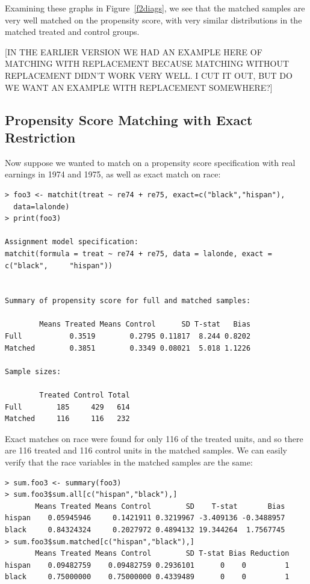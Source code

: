 \documentclass[oneside,letterpaper,titlepage]{article}
\begin{document}
Examining these graphs in Figure~\ref{f2diags}, we see that the matched samples are very well matched on the propensity score, with very similar distributions
in the matched treated and control groups.

[IN THE EARLIER VERSION WE HAD AN EXAMPLE HERE OF MATCHING WITH REPLACEMENT BECAUSE MATCHING WITHOUT REPLACEMENT DIDN'T WORK VERY WELL.  I CUT IT OUT, BUT
DO WE WANT AN EXAMPLE WITH REPLACEMENT SOMEWHERE?]

\subsection{Propensity Score Matching with Exact Restriction}

Now suppose we wanted to match on a propensity score specification with real earnings in 1974 and 1975, 
as well as exact match on race:

\begin{verbatim}
> foo3 <- matchit(treat ~ re74 + re75, exact=c("black","hispan"),
  data=lalonde)
> print(foo3)
 
Assignment model specification:
matchit(formula = treat ~ re74 + re75, data = lalonde, exact = c("black",     "hispan"))
 
 
Summary of propensity score for full and matched samples:
 
        Means Treated Means Control      SD T-stat   Bias
Full           0.3519        0.2795 0.11817  8.244 0.8202
Matched        0.3851        0.3349 0.08021  5.018 1.1226
 
Sample sizes:
 
        Treated Control Total
Full        185     429   614
Matched     116     116   232
\end{verbatim}

Exact matches on race were found for only 116 of the treated units, and so there are 116 treated and 116 control units in the matched samples.  We can 
easily verify that the race variables in the matched samples
are the same:

\begin{verbatim}
> sum.foo3 <- summary(foo3)
> sum.foo3$sum.all[c("hispan","black"),]
       Means Treated Means Control        SD    T-stat       Bias
hispan    0.05945946     0.1421911 0.3219967 -3.409136 -0.3488957
black     0.84324324     0.2027972 0.4894132 19.344264  1.7567745
> sum.foo3$sum.matched[c("hispan","black"),]
       Means Treated Means Control        SD T-stat Bias Reduction
hispan    0.09482759    0.09482759 0.2936101      0    0         1
black     0.75000000    0.75000000 0.4339489      0    0         1
\end{verbatim}
\end{document}
